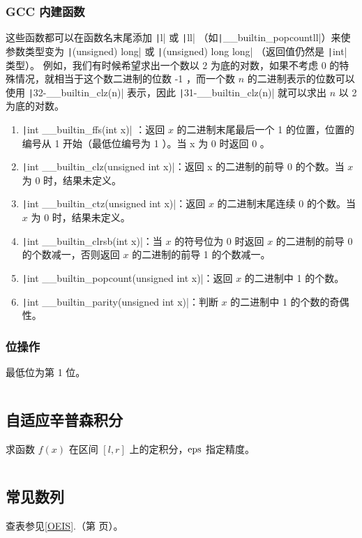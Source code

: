\documentclass[a4paper, twoside]{article}
\newcommand\detailedref[1]{\ref{#1}.\nameref{#1}（第 \pageref{#1} 页）}
\begin{document}
    \subsubsection{GCC 内建函数}
    这些函数都可以在函数名末尾添加 \texttt|l| 或 \texttt|ll| （如\texttt|__builtin_popcountll|）来使参数类型变为 \texttt|(unsigned) long| 或 \texttt|(unsigned) long long| （返回值仍然是 \texttt|int| 类型）。 例如，我们有时候希望求出一个数以 2 为底的对数，如果不考虑 0 的特殊情况，就相当于这个数二进制的位数 -1 ，而一个数 $n$ 的二进制表示的位数可以使用 \texttt|32-__builtin_clz(n)| 表示，因此 \texttt|31-__builtin_clz(n)| 就可以求出 $n$ 以 2 为底的对数。
    \begin{enumerate}
        \item \texttt|int __builtin_ffs(int x)| ：返回 $x$ 的二进制末尾最后一个 1 的位置，位置的编号从 1 开始（最低位编号为 1 ）。当 x 为 0 时返回 0 。
        \item \texttt|int __builtin_clz(unsigned int x)|：返回 x 的二进制的前导 0 的个数。当 $x$ 为 0 时，结果未定义。
        \item \texttt|int __builtin_ctz(unsigned int x)|：返回 $x$ 的二进制末尾连续 0 的个数。当 $x$ 为 0 时，结果未定义。
        \item \texttt|int __builtin_clrsb(int x)|：当 $x$ 的符号位为 0 时返回 $x$ 的二进制的前导 0 的个数减一，否则返回 $x$ 的二进制的前导 1 的个数减一。
        \item \texttt|int __builtin_popcount(unsigned int x)|：返回 $x$ 的二进制中 1 的个数。
        \item \texttt|int __builtin_parity(unsigned int x)|：判断 $x$ 的二进制中 1 的个数的奇偶性。
    \end{enumerate}

    \subsubsection{位操作}
    最低位为第 1 位。
    \inputminted{cpp}{../src/数学/二进制相关.cpp}

\subsection{自适应辛普森积分}
求函数 $f(x)$ 在区间 $[l, r]$ 上的定积分，$\rm{eps}$ 指定精度。
\inputminted{cpp}{../src/数学/自适应辛普森积分.cpp}
    
\subsection{常见数列}
查表参见\detailedref{OEIS}。
\end{document}
